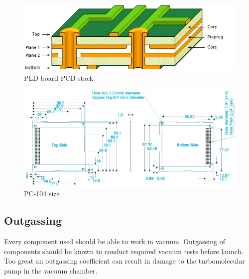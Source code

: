         \begin{figure}[H]
            \centering
            \includegraphics[width=0.7\paperwidth]{img/04/PLD_PCB_stack.png}
            \caption{PLD board PCB stack}
            \label{PLD_PCB_stack}
        \end{figure}

        \begin{figure}[H]
            \centering
            \includegraphics[width=0.7\paperwidth]{img/04/PC104_PLD_size.png}
            \caption{PC-104 size}
            \label{PLD_PCB_size}
        \end{figure}



    \subsection{Outgassing}
        Every component used should be able to work in vacuum. Outgassing of components should be known to conduct required vacuum tests before launch. Too great an outgassing coefficient can result in damage to the turbomolecular pump in the vacuum chamber.

